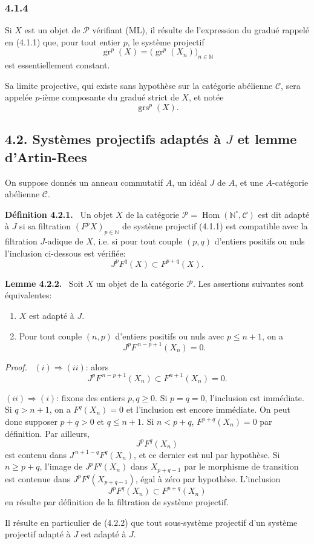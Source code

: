 \documentclass[11pt]{article}
\newenvironment{statement}[1]{\par\medskip\noindent\textbf{#1.}\ }{\par\medskip}
\newenvironment{prooftext}[1][Proof]{\par\noindent\emph{#1.}\ }{\par\medskip}
\DeclareMathOperator{\Hom}{Hom}
\providecommand{\gr}{\operatorname{gr}}
\providecommand{\Hom}{\operatorname{Hom}}
\providecommand{\gr}{\operatorname{gr}}
\providecommand{\gr}{\operatorname{gr}}
\providecommand{\grs}{\operatorname{grs}}
\providecommand{\Hom}{\operatorname{Hom}}
\begin{document}
\subsubsection*{4.1.4}
Si $X$ est un objet de \(\mathcal P\) vérifiant (ML), il résulte de l'expression du gradué rappelé en (4.1.1) que, pour tout entier \(p\), le système projectif
\[
\gr^p(X)=\bigl(\gr^p(X_n)\bigr)_{n\in\mathbb N}
\]
est essentiellement constant.

Sa limite projective, qui existe sans hypothèse sur la catégorie abélienne \(\mathcal C\), sera appelée \(p\)-ième composante du gradué strict de \(X\), et notée
\[
\grs^p(X).
\]

\subsection*{4.2. Systèmes projectifs adaptés à \(J\) et lemme d'Artin-Rees}

On suppose donnés un anneau commutatif \(A\), un idéal \(J\) de \(A\), et une \(A\)-catégorie abélienne \(\mathcal C\).

\begin{statement}{Définition 4.2.1}
Un objet \(X\) de la catégorie \(\mathcal P=\Hom(\mathbb N^\circ,\mathcal C)\) est dit adapté à \(J\) si sa filtration \((F^pX)_{p\in\mathbb N}\) de système projectif (4.1.1) est compatible avec la filtration \(J\)-adique de \(X\), i.e. si pour tout couple \((p,q)\) d'entiers positifs ou nuls l'inclusion ci-dessous est vérifiée:
\[
J^pF^q(X)\subset F^{p+q}(X).
\]
\end{statement}

\begin{statement}{Lemme 4.2.2}
Soit \(X\) un objet de la catégorie \(\mathcal P\). Les assertions suivantes sont équivalentes:
\begin{enumerate}[label=\textup{(\roman*)}]
\item \(X\) est adapté à \(J\).
\item Pour tout couple \((n,p)\) d'entiers positifs ou nuls avec \(p\le n+1\), on a
\[
J^pF^{\,n-p+1}(X_n)=0 .
\]
\end{enumerate}
\end{statement}

\begin{prooftext}
\((i)\Rightarrow(ii)\): alors
\[
J^pF^{\,n-p+1}(X_n)\subset F^{n+1}(X_n)=0.
\]

\((ii)\Rightarrow(i)\): fixons des entiers \(p,q\ge0\). Si \(p=q=0\), l'inclusion est immédiate. Si \(q>n+1\), on a \(F^q(X_n)=0\) et l'inclusion est encore immédiate. On peut donc supposer \(p+q>0\) et \(q\le n+1\). Si \(n<p+q\), \(F^{p+q}(X_n)=0\) par définition. Par ailleurs,
\[
J^pF^q(X_n)
\]
est contenu dans \(J^{\,n+1-q}F^q(X_n)\), et ce dernier est nul par hypothèse. Si \(n\ge p+q\), l'image de \(J^pF^q(X_n)\) dans \(X_{p+q-1}\) par le morphisme de transition est contenue dans \(J^pF^q(X_{p+q-1})\), égal à zéro par hypothèse. L'inclusion
\[
J^pF^q(X_n)\subset F^{p+q}(X_n)
\]
en résulte par définition de la filtration de système projectif.

Il résulte en particulier de (4.2.2) que tout sous-système projectif d'un système projectif adapté à \(J\) est adapté à \(J\).
\end{prooftext}
\end{document}
